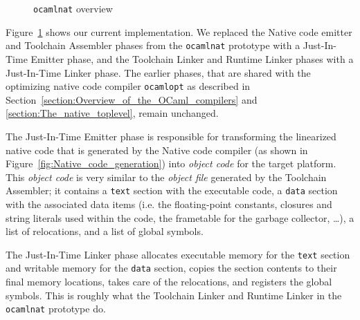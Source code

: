 \documentclass[10pt,a4paper,final,twocolumn]{article}
\makeatletter
\newcommand{\ie}{i.e.\@\xspace}
\makeatother
\begin{document}
\begin{figure}[htb]
  \centering
  \caption{\texttt{ocamlnat} overview}
  \label{fig:ocamlnat_overview}
\end{figure}

Figure~\ref{fig:ocamlnat_overview} shows our current implementation. We replaced
the Native code emitter and Toolchain Assembler phases from the \texttt{ocamlnat} prototype with
a Just-In-Time Emitter phase, and the Toolchain Linker and Runtime Linker phases with a Just-In-Time
Linker phase. The earlier phases, that are shared with the optimizing native code compiler
\texttt{ocamlopt} as described in Section~\ref{section:Overview_of_the_OCaml_compilers} and
\ref{section:The_native_toplevel}, remain unchanged.

The Just-In-Time Emitter phase is responsible for transforming the linearized native code that is
generated by the Native code compiler (as shown in Figure~\ref{fig:Native_code_generation}) into
\emph{object code} for the target platform. This \emph{object code} is very similar to the \emph{object
file} generated by the Toolchain Assembler; it contains a \texttt{text} section with the executable
code, a \texttt{data} section with the associated data items (\ie the floating-point constants, closures
and string literals used within the code, the frametable for the garbage collector, \ldots), a list
of relocations, and a list of global symbols.

The Just-In-Time Linker phase allocates executable memory for the \texttt{text} section and writable
memory for the \texttt{data} section, copies the section contents to their final memory locations,
takes care of the relocations, and registers the global symbols. This is roughly what the Toolchain
Linker and Runtime Linker in the \texttt{ocamlnat} prototype do.
\end{document}
